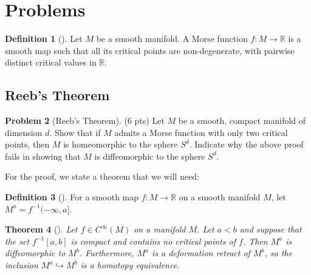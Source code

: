 \documentclass[reqno]{amsart}
\newtheorem{theorem}{Theorem}[section]
\theoremstyle{definition}
\newtheorem{definition}[theorem]{Definition}
\newtheorem{problem}[theorem]{Problem}
\theoremstyle{remark}
\begin{document}
\section{Problems}

\begin{definition}[]
    Let $M$ be a smooth manifold. A Morse function
    $f \colon M \to \mathbb{R}$ is a smooth map such that
    all its critical points are non-degenerate, with
    pairwise distinct critical values in $\mathbb{R}$.
\end{definition}

\subsection{Reeb's Theorem}

\begin{problem}[Reeb's Theorem]\label{Reeb's-Theorem}
        (6 pts) Let $M$ be a smooth, compact manifold of
        dimension $d$. Show that if $M$ admits a Morse
        function with only two critical points, then
        $M$ is homeomorphic to the sphere $S^{d}$. Indicate
        why the above proof fails in showing that $M$ is
        diffeomorphic to the sphere $S^{d}$.
    \end{problem}

    For the proof, we state a theorem that we will need:
    \begin{definition}[]
        For a smooth map $f \colon M \to \mathbb{R}$ on a 
        smooth manifold $M$, let
        $M^{a} = f^{-1} (-\infty, a]$.
    \end{definition}

    \begin{theorem}[]\label{Thm1}
        Let $f \in C^{\infty}(M)$ on a manifold $M$.
        Let $a < b$ and suppose that the set
        $f^{-1}\left[ a,b \right] $ is compact and
        contains no critical points of $f$. Then
        $M^{a}$ is diffeomorphic to $M^{b}$. Furthermore,
        $M^{a}$ is a deformation retract of
        $M^{b}$, so the inclusion $M^{a} \hookrightarrow 
        M^{b}$ is a homotopy equivalence.
    \end{theorem}
\end{document}
